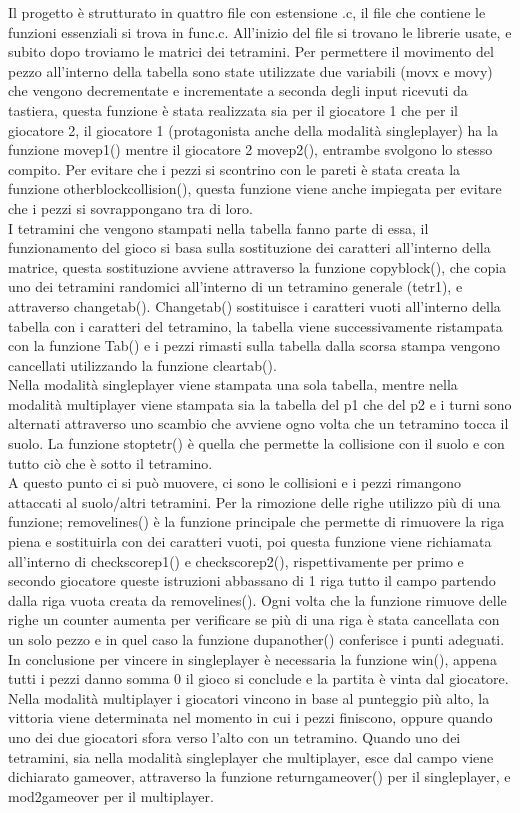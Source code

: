 \documentclass[12pt, letterpaper]{article}
\begin{document}
Il progetto è strutturato in quattro file con estensione .c,
il file che contiene le funzioni essenziali si trova in func.c.
All'inizio del file si trovano le librerie usate, e subito dopo
troviamo le matrici dei tetramini. Per permettere il movimento del 
pezzo all'interno della tabella sono state utilizzate
due variabili (movx e movy) che vengono decrementate e incrementate a seconda degli
input ricevuti da tastiera, questa funzione è stata realizzata sia per il giocatore 
1 che per il giocatore 2, il giocatore 1 (protagonista anche della modalità singleplayer)
ha la funzione movep1() mentre il giocatore 2 movep2(), entrambe svolgono lo stesso compito.
Per evitare che i pezzi si scontrino con le pareti è stata creata la funzione 
otherblockcollision(), questa funzione viene anche impiegata per evitare che i 
pezzi si sovrappongano tra di loro.\\
I tetramini che vengono stampati nella tabella fanno parte di essa, il funzionamento del gioco 
si basa sulla sostituzione dei caratteri all'interno della matrice, questa sostituzione 
avviene attraverso la funzione copyblock(), che copia uno dei tetramini randomici all'interno di un tetramino generale (tetr1), e attraverso 
changetab(). Changetab() sostituisce i caratteri vuoti all'interno della tabella con i caratteri del tetramino,
la tabella viene successivamente ristampata con la funzione Tab() e i pezzi rimasti sulla tabella 
dalla scorsa stampa vengono cancellati utilizzando la funzione cleartab().\\
Nella modalità singleplayer viene stampata una sola tabella, mentre nella modalità multiplayer viene stampata sia la 
tabella del p1 che del p2 e i turni sono alternati attraverso uno scambio che avviene ogno volta che un tetramino tocca il suolo.
La funzione stoptetr() è quella che permette la collisione con il suolo
e con tutto ciò che è sotto il tetramino.\\ A questo punto ci si può muovere, ci sono le collisioni e i pezzi 
rimangono attaccati al suolo/altri tetramini. Per la rimozione delle righe utilizzo più di una funzione;
removelines() è la funzione principale che permette di rimuovere la riga piena e sostituirla con dei caratteri vuoti, 
poi questa funzione viene richiamata all'interno di checkscorep1() e checkscorep2(), rispettivamente per primo e secondo giocatore 
queste istruzioni abbassano di 1 riga tutto il campo partendo dalla riga vuota creata da removelines().
Ogni volta che la funzione rimuove delle righe un counter aumenta per verificare se più di una riga è stata
cancellata con un solo pezzo e in quel caso la funzione dupanother() conferisce i punti adeguati.
In conclusione per vincere in singleplayer è necessaria la funzione win(), appena tutti i pezzi danno somma 
0 il gioco si conclude e la partita è vinta dal giocatore. Nella modalità multiplayer i giocatori vincono in base al punteggio più alto, 
la vittoria viene determinata nel momento in cui i pezzi finiscono, oppure quando uno dei due giocatori sfora verso l'alto con un tetramino.
Quando uno dei tetramini, sia nella modalità singleplayer che multiplayer, esce dal campo viene dichiarato gameover, attraverso la funzione returngameover() per il singleplayer, e mod2gameover per il multiplayer.
\end{document}
